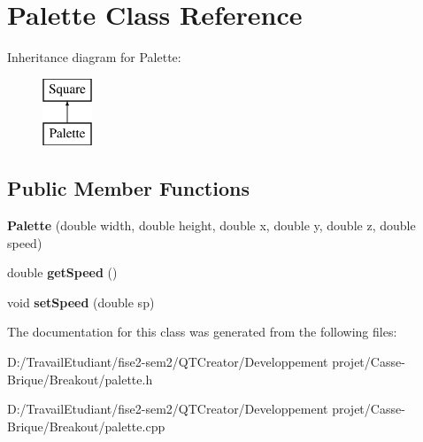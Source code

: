 \hypertarget{class_palette}{}\section{Palette Class Reference}
\label{class_palette}
Inheritance diagram for Palette\+:\begin{figure}[H]
\begin{center}
\leavevmode
\includegraphics[height=2.000000cm]{class_palette}
\end{center}
\end{figure}
\subsection*{Public Member Functions}
\begin{DoxyCompactItemize}
\item 
\mbox{\label{class_palette_aba73583ea3ed774a01dc91768c06b136}} 
{\bfseries Palette} (double width, double height, double x, double y, double z, double speed)
\item 
\mbox{\label{class_palette_a3668970bbba4c28104443ff68a682da9}} 
double {\bfseries get\+Speed} ()
\item 
\mbox{\label{class_palette_ad8d5e54600152a30732b766f8a1d7739}} 
void {\bfseries set\+Speed} (double sp)
\end{DoxyCompactItemize}


The documentation for this class was generated from the following files\+:\begin{DoxyCompactItemize}
\item 
D\+:/\+Travail\+Etudiant/fise2-\/sem2/\+Q\+T\+Creator/\+Developpement projet/\+Casse-\/\+Brique/\+Breakout/palette.\+h\item 
D\+:/\+Travail\+Etudiant/fise2-\/sem2/\+Q\+T\+Creator/\+Developpement projet/\+Casse-\/\+Brique/\+Breakout/palette.\+cpp\end{DoxyCompactItemize}

